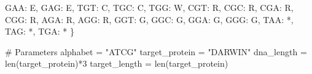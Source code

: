 \documentclass[
  letterpaper,
  DIV=11,
  numbers=noendperiod]{scrreprt}
\newenvironment{Shaded}{\begin{snugshade}}{\end{snugshade}}
\newcommand{\BuiltInTok}[1]{\textcolor[rgb]{0.00,0.23,0.31}{#1}}
\newcommand{\CommentTok}[1]{\textcolor[rgb]{0.37,0.37,0.37}{#1}}
\newcommand{\DecValTok}[1]{\textcolor[rgb]{0.68,0.00,0.00}{#1}}
\newcommand{\NormalTok}[1]{\textcolor[rgb]{0.00,0.23,0.31}{#1}}
\newcommand{\OperatorTok}[1]{\textcolor[rgb]{0.37,0.37,0.37}{#1}}
\newcommand{\StringTok}[1]{\textcolor[rgb]{0.13,0.47,0.30}{#1}}
\theoremstyle{definition}
\theoremstyle{remark}
\begin{document}
\begin{tcolorbox}
\begin{Shaded}
\begin{Highlighting}[]
    \StringTok{\textquotesingle{}GAA\textquotesingle{}}\NormalTok{: }\StringTok{\textquotesingle{}E\textquotesingle{}}\NormalTok{, }\StringTok{\textquotesingle{}GAG\textquotesingle{}}\NormalTok{: }\StringTok{\textquotesingle{}E\textquotesingle{}}\NormalTok{, }\StringTok{\textquotesingle{}TGT\textquotesingle{}}\NormalTok{: }\StringTok{\textquotesingle{}C\textquotesingle{}}\NormalTok{, }\StringTok{\textquotesingle{}TGC\textquotesingle{}}\NormalTok{: }\StringTok{\textquotesingle{}C\textquotesingle{}}\NormalTok{,}
    \StringTok{\textquotesingle{}TGG\textquotesingle{}}\NormalTok{: }\StringTok{\textquotesingle{}W\textquotesingle{}}\NormalTok{, }\StringTok{\textquotesingle{}CGT\textquotesingle{}}\NormalTok{: }\StringTok{\textquotesingle{}R\textquotesingle{}}\NormalTok{, }\StringTok{\textquotesingle{}CGC\textquotesingle{}}\NormalTok{: }\StringTok{\textquotesingle{}R\textquotesingle{}}\NormalTok{, }\StringTok{\textquotesingle{}CGA\textquotesingle{}}\NormalTok{: }\StringTok{\textquotesingle{}R\textquotesingle{}}\NormalTok{, }\StringTok{\textquotesingle{}CGG\textquotesingle{}}\NormalTok{: }\StringTok{\textquotesingle{}R\textquotesingle{}}\NormalTok{, }\StringTok{\textquotesingle{}AGA\textquotesingle{}}\NormalTok{: }\StringTok{\textquotesingle{}R\textquotesingle{}}\NormalTok{, }\StringTok{\textquotesingle{}AGG\textquotesingle{}}\NormalTok{: }\StringTok{\textquotesingle{}R\textquotesingle{}}\NormalTok{,}
    \StringTok{\textquotesingle{}GGT\textquotesingle{}}\NormalTok{: }\StringTok{\textquotesingle{}G\textquotesingle{}}\NormalTok{, }\StringTok{\textquotesingle{}GGC\textquotesingle{}}\NormalTok{: }\StringTok{\textquotesingle{}G\textquotesingle{}}\NormalTok{, }\StringTok{\textquotesingle{}GGA\textquotesingle{}}\NormalTok{: }\StringTok{\textquotesingle{}G\textquotesingle{}}\NormalTok{, }\StringTok{\textquotesingle{}GGG\textquotesingle{}}\NormalTok{: }\StringTok{\textquotesingle{}G\textquotesingle{}}\NormalTok{,}
    \StringTok{\textquotesingle{}TAA\textquotesingle{}}\NormalTok{: }\StringTok{\textquotesingle{}*\textquotesingle{}}\NormalTok{, }\StringTok{\textquotesingle{}TAG\textquotesingle{}}\NormalTok{: }\StringTok{\textquotesingle{}*\textquotesingle{}}\NormalTok{, }\StringTok{\textquotesingle{}TGA\textquotesingle{}}\NormalTok{: }\StringTok{\textquotesingle{}*\textquotesingle{}}
\NormalTok{\}}

\CommentTok{\# Parameters}
\NormalTok{alphabet }\OperatorTok{=} \StringTok{"ATCG"}
\NormalTok{target\_protein }\OperatorTok{=} \StringTok{"DARWIN"}
\NormalTok{dna\_length }\OperatorTok{=} \BuiltInTok{len}\NormalTok{(target\_protein)}\OperatorTok{*}\DecValTok{3}
\NormalTok{target\_length }\OperatorTok{=} \BuiltInTok{len}\NormalTok{(target\_protein)}


\end{Highlighting}
\end{Shaded}
\end{tcolorbox}
\end{document}
